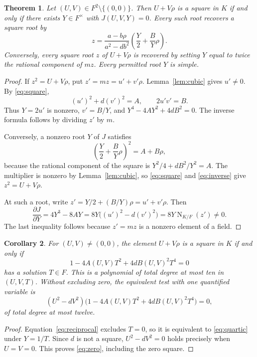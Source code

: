 \documentclass[11pt,a4paper]{article}
\newtheorem{theorem}{Theorem}[section]
\newtheorem{corollary}[theorem]{Corollary}
\DeclareMathOperator{\N}{N}
\begin{document}
\begin{theorem}\label{thm:chart}
Let $(U,V)\in F^2\setminus\{(0,0)\}$. Then $U+V\rho$ is
a square in $K$ if and only if there exists $Y\in F^\times$
with $J(U,V,Y)=0$. Every such root recovers a square root by
\begin{equation}\label{eq:inverse}
 z=\frac{a-b\rho}{a^2-db^2}
                  \left(\frac Y2+\frac BY\rho\right).
\end{equation}
Conversely, every square root $z$ of $U+V\rho$ is recovered by
setting $Y$ equal to twice the rational component of $mz$.
Every permitted root $Y$ is simple.
\end{theorem}
\begin{proof}
If $z^2=U+V\rho$, put $z'=mz=u'+v'\rho$.
Lemma~\ref{lem:cubic} gives $u'\ne0$. By
\eqref{eq:square},
\[
       (u')^2+d(v')^2=A,\qquad 2u'v'=B.
\]
Thus $Y=2u'$ is nonzero, $v'=B/Y$, and
$Y^4-4AY^2+4dB^2=0$. The inverse formula follows by
dividing $z'$ by $m$.

Conversely, a nonzero root $Y$ of $J$ satisfies
\[
 \left(\frac Y2+\frac BY\rho\right)^2=A+B\rho,
\]
because the rational component of the square is
$Y^2/4+dB^2/Y^2=A$. The multiplier is nonzero by
Lemma~\ref{lem:cubic}, so \eqref{eq:square} and
\eqref{eq:inverse} give $z^2=U+V\rho$.

At such a root, write $z'=Y/2+(B/Y)\rho=u'+v'\rho$.
Then
\[
 \frac{\partial J}{\partial Y}
    =4Y^3-8AY
    =8Y\bigl((u')^2-d(v')^2\bigr)
    =8Y\N_{K/F}(z')\ne0.
\]
The last inequality follows because $z'=mz$ is a nonzero
element of a field.
\end{proof}

\begin{corollary}\label{cor:test}
For $(U,V)\ne(0,0)$, the element $U+V\rho$ is a square in $K$
if and only if
\begin{equation}\label{eq:reciprocal}
       1-4A(U,V)T^2+4dB(U,V)^2T^4=0
\end{equation}
has a solution $T\in F$. This is a polynomial of total degree
at most ten in $(U,V,T)$. Without excluding zero, the equivalent
test with one quantified variable is
\begin{equation}\label{eq:zero}
 (U^2-dV^2)\bigl(1-4A(U,V)T^2
                         +4dB(U,V)^2T^4\bigr)=0,
\end{equation}
of total degree at most twelve.
\end{corollary}
\begin{proof}
Equation~\eqref{eq:reciprocal} excludes $T=0$, so it is
equivalent to \eqref{eq:quartic} under $Y=1/T$.
Since $d$ is not a square, $U^2-dV^2=0$ holds precisely when
$U=V=0$. This proves \eqref{eq:zero}, including the zero
square.
\end{proof}
\end{document}

